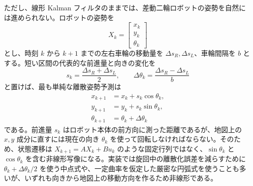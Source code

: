 ただし、線形 Kalman フィルタのままでは、差動二輪ロボットの姿勢を自然には進められない。ロボットの姿勢を
\begin{equation}
  X_k=
  \begin{bmatrix}
    x_k\\ y_k\\ \theta_k
  \end{bmatrix}
\end{equation}
とし、時刻 $k$ から $k+1$ までの左右車輪の移動量を $\Delta s_R,\Delta s_L$、車輪間隔を $b$ とする。短い区間の代表的な前進量と向きの変化を
\begin{equation}
  s_k=\frac{\Delta s_R+\Delta s_L}{2},
  \qquad
  \Delta\theta_k=\frac{\Delta s_R-\Delta s_L}{b}
\end{equation}
と置けば、最も単純な離散姿勢予測は
\begin{align}
  x_{k+1}&=x_k+s_k\cos\theta_k,\\
  y_{k+1}&=y_k+s_k\sin\theta_k,\\
  \theta_{k+1}&=\theta_k+\Delta\theta_k
  \label{eq:flow-six-pose-prediction}
\end{align}
である。前進量 $s_k$ はロボット本体の前方向に測った距離であるが、地図上の $x,y$ 成分に直すには現在の向き $\theta_k$ を使って回転しなければならない。そのため、状態遷移は $X_{k+1}=AX_k+Bu_k$ のような固定行列ではなく、$\sin\theta_k$ と $\cos\theta_k$ を含む非線形写像になる。実装では旋回中の離散化誤差を減らすために $\theta_k+\Delta\theta_k/2$ を使う中点式や、一定曲率を仮定した厳密な円弧式を使うことも多いが、いずれも向きから地図上の移動方向を作るため非線形である。

